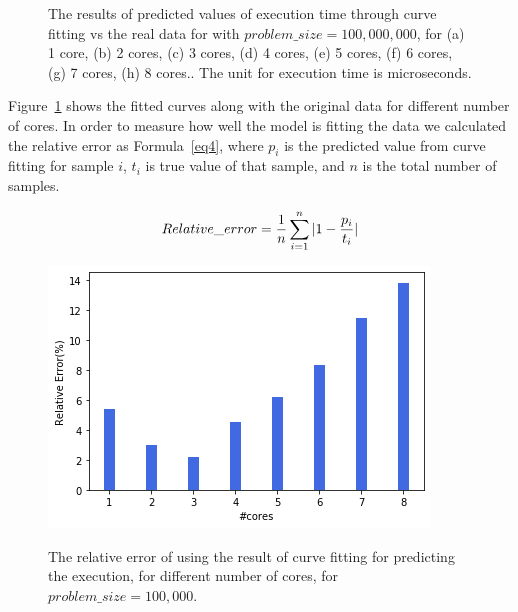 \begin{figure}[H]
{	\label{fig43:g}}
\hfill
	\caption{The results of predicted values of execution time through curve fitting vs the real data for with $problem\_size=100,000,000$, for (a) 1 core, (b) 2 cores, (c) 3 cores, (d) 4 cores, (e) 5 cores, (f) 6 cores, (g) 7 cores, (h) 8 cores.. The unit for execution time is microseconds.}
	\label{fig43}	
\end{figure}


Figure~\ref{fig43} shows the fitted curves along with the original data for different number of cores.
In order to measure how well the model is fitting the data we calculated the relative error as Formula~\ref{eq4}, where $p_i$ is the predicted value from curve fitting for sample $i$, $t_i$ is true value of that sample, and $n$ is the total number of samples.


\begin{equation}{\label{eq4}}
Relative\_{error} = \frac{1}{n}\sum_{i=1}^{n} {|1-\frac{p_i}{t_i}|}
\end{equation}

\begin{figure}[H]
	\centering
	{\includegraphics[scale=.45]{images/hpx_for_loop/fitted/marvin_relative_error_100000000.png}}
	\caption{The relative error of using the result of curve fitting for predicting the execution, for different number of cores, for $problem\_size=100,000$.}\label{fig44}		
\end{figure}



